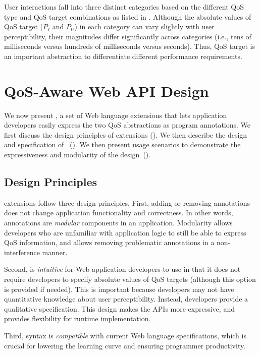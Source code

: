 User interactions fall into three distinct categories based on the different QoS type and QoS target combinations as listed in . Although the absolute values of QoS target ($P_I$ and $P_U$) in each category can vary slightly with user perceptibility, their magnitudes differ significantly across categories (i.e., tens of milliseconds versus hundreds of milliseconds versus seconds). Thus, QoS target is an important abstraction to differentiate different performance requirements.

\section{QoS-Aware Web API Design}
\label{sec:lang:spec}

We now present \greenweb, a set of Web language extensions that lets application developers easily express the two QoS abstractions as program annotations. We first discuss the design principles of \greenweb extensions (). We then describe the design and specification of \greenweb~(). We then present usage scenarios to demonstrate the expressiveness and modularity of the \greenweb design~().

\subsection{Design Principles}
\label{sec:lang:spec:principles}

\greenweb extensions follow three design principles. First, adding or removing \greenweb annotations does not change application functionality and correctness. In other words, \greenweb annotations are \textit{modular} components in an application. Modularity allows developers who are unfamiliar with application logic to still be able to express QoS information, and allows removing problematic annotations in a non-interference manner.

Second, \greenweb is \textit{intuitive} for Web application developers to use in that it does not require developers to specify absolute values of QoS targets (although this option is provided if needed). This is important because developers may not have quantitative knowledge about user perceptibility. Instead, developers provide a qualitative specification. This design makes the APIs more expressive, and provides flexibility for runtime implementation. 

Third, \greenweb syntax is \textit{compatible} with current Web language specifications, which is crucial for lowering the learning curve and ensuring programmer productivity.

